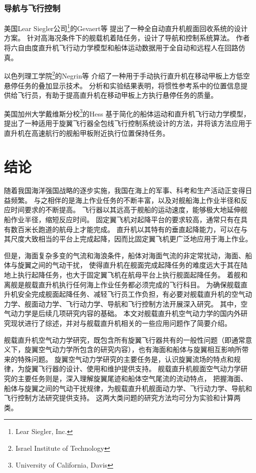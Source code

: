 \documentclass[doctor,openright,twoside,color]{buaathesis}
\begin{document}
\subsection{导航与飞行控制}

美国Lear Siegler公司\footnote{Lear Siegler, Inc.}的Gevaert等
提出了一种全自动直升机舰面回收系统的设计方案。
针对高海况条件下的舰载机着陆任务，设计了导航和控制系统算法。
作者将六自由度直升机飞行动力学模型和船体运动数据用于全自动和远程人在回路仿真。

以色列理工学院\footnote{Israel Institute of Technology}的Negrin等
介绍了一种用于手动执行直升机在移动甲板上方低空悬停任务的叠加显示技术。
分析和实验结果表明，将惯性参考系中的位置信息提供给飞行员，有助于提高直升机在移动甲板上方执行悬停任务的质量。

美国加州大学戴维斯分校\footnote{University of California, Davis}的Hess
基于简化的船体运动和直升机飞行动力学模型，提出了一种适用于旋翼飞行器全包线飞行控制系统设计的方法，并将该方法应用于直升机在高速航行的舰船甲板附近执行位置保持任务。

\chapter{结论}
随着我国海洋强国战略的逐步实施，我国在海上的军事、科考和生产活动正变得日益频繁。
与之相伴的是海上作业任务的不断丰富，以及对舰船海上作业半径和反应时间要求的不断提高。
飞行器以其远高于舰船的运动速度，能够极大地延伸舰船作业半径，缩短反应时间。
固定翼飞机对起降平台的要求较高，通常只有在具有数百米长跑道的航母上才能完成。
直升机以其特有的垂直起降能力，可以在与其尺度大致相当的平台上完成起降，因而比固定翼飞机更广泛地应用于海上作业。

但是，海面复杂多变的气流和海浪条件，船体对海面气流的非定常扰动，海面、船体与旋翼之间的气动干扰，
使得直升机在舰面完成起降任务的难度远大于其在陆地上执行起降任务，也大于固定翼飞机在航母平台上执行舰面起降任务。
着舰和离舰是舰载直升机执行任何海上作业任务都必须完成的飞行科目。
为确保舰载直升机安全完成舰面起降任务、减轻飞行员工作负担，有必要对舰载直升机的空气动力学、舰面动力学、飞行动力学、导航和飞行控制方法开展深入研究。
其中，空气动力学是后续几项研究内容的基础。
本文对舰载直升机空气动力学的国内外研究现状进行了综述，并对与舰载直升机相关的一些应用问题作了简要介绍。

舰载直升机空气动力学研究，既包含所有旋翼飞行器共有的一般性问题（即通常意义下，旋翼空气动力学所包含的研究内容），也有海面和船体与旋翼相互影响所带来的特殊问题。
旋翼空气动力学研究的主要任务是，认识旋翼流场的特点和规律，为旋翼飞行器的设计、使用和维护提供支持。
舰载直升机舰面空气动力学研究的主要任务则是，深入理解旋翼尾迹和船体空气尾流的流动特点，
把握海面、船体与旋翼之间的气动干扰规律，为舰载直升机舰面动力学、飞行动力学、导航和飞行控制方法研究提供支持。
这两大类问题的研究方法均可分为实验和计算两类。
\end{document}
